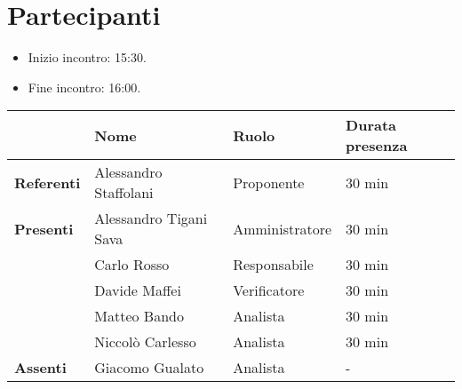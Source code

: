 \section*{Partecipanti}

\begin{itemize}
	\item Inizio incontro: 15:30.
	\item Fine incontro: 16:00.
\end{itemize}


\begin{center}
	{\renewcommand{\arraystretch}{1.5}
		\begin{tabular}{l|lll}
			                   & \textbf{Nome}          & \textbf{Ruolo} & \textbf{Durata presenza} \\
			\hline
			\textbf{Referenti} & Alessandro Staffolani  & Proponente     & 30 min                   \\
			\hline
			\textbf{Presenti}  & Alessandro Tigani Sava & Amministratore & 30 min                   \\
			                   & Carlo Rosso            & Responsabile   & 30 min                   \\
			                   & Davide Maffei          & Verificatore   & 30 min                   \\
			                   & Matteo Bando           & Analista       & 30 min                   \\
			                   & Niccolò Carlesso       & Analista       & 30 min                   \\
			\hline
			\textbf{Assenti}   & Giacomo Gualato        & Analista       & -                        \\
		\end{tabular}
	}
\end{center}
